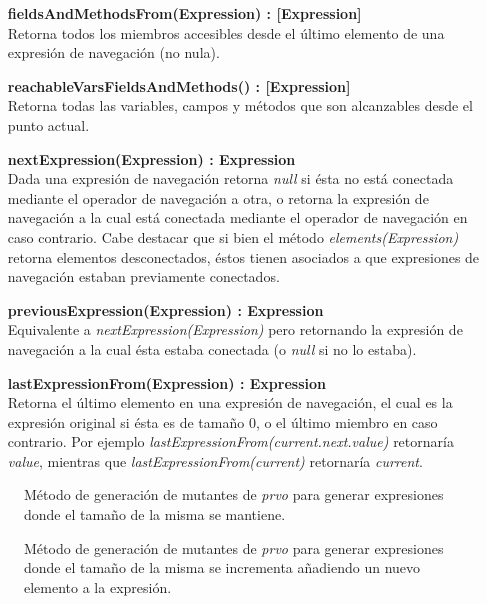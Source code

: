 \begin{enumerate}[leftmargin=.75cm,align=left]
	\item[\textbf{fieldsAndMethodsFrom(Expression) : [Expression]}]\mbox{}\\ Retorna todos los miembros accesibles desde el \'ultimo elemento de una expresi\'on de navegaci\'on (no nula).
	
	\item[\textbf{reachableVarsFieldsAndMethods() : [Expression]}]\mbox{}\\ Retorna todas las variables, campos y m\'etodos que son alcanzables desde el punto actual.
	
	\item[\textbf{nextExpression(Expression) : Expression}]\mbox{}\\ Dada una expresi\'on de navegaci\'on retorna \emph{null} si \'esta no est\'a conectada mediante el operador de navegaci\'on a otra, o retorna la expresi\'on de navegaci\'on a la cual est\'a conectada mediante el operador de navegaci\'on en caso contrario. Cabe destacar que si bien el m\'etodo \emph{elements(Expression)} retorna elementos desconectados, \'estos tienen asociados a que expresiones de navegaci\'on estaban previamente conectados.
	
	\item[\textbf{previousExpression(Expression) : Expression}]\mbox{}\\ Equivalente a \emph{nextExpression(Expression)} pero retornando la expresi\'on de navegaci\'on a la cual \'esta estaba conectada (o \emph{null} si no lo estaba).
	
	\item[\textbf{lastExpressionFrom(Expression) : Expression}]\mbox{}\\ Retorna el \'ultimo elemento en una expresi\'on de navegaci\'on, el cual es la expresi\'on original si \'esta es de tama\~no $0$, o el \'ultimo miembro en caso contrario. Por ejemplo \emph{lastExpressionFrom(current.next.value)} retornar\'ia \emph{value}, mientras que \emph{lastExpressionFrom(current)} retornar\'ia \emph{current}.
\end{enumerate}

\begin{figure}
	
	\caption{M\'etodo de generaci\'on de mutantes de \emph{prvo} para generar expresiones donde el tama\~no de la misma se mantiene.}
	\label{figures.code.prvoMethods.sameLength}
\end{figure}

\begin{figure}
	
	\caption{M\'etodo de generaci\'on de mutantes de \emph{prvo} para generar expresiones donde el tama\~no de la misma se incrementa a\~nadiendo un nuevo elemento a la expresi\'on.}
	\label{figures.code.prvoMethods.increaseLength}
\end{figure}

